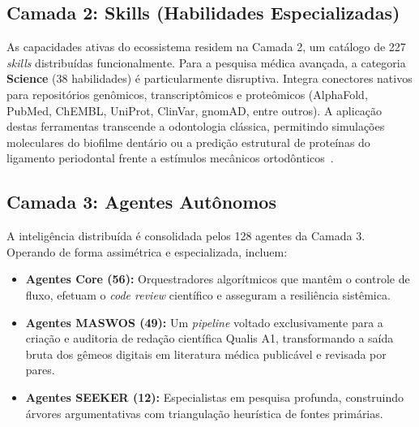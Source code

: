 \subsection{Camada 2: Skills (Habilidades Especializadas)}
As capacidades ativas do ecossistema residem na Camada 2, um catálogo de 227 \textit{skills} distribuídas funcionalmente. Para a pesquisa médica avançada, a categoria \textbf{Science} (38 habilidades) é particularmente disruptiva. Integra conectores nativos para repositórios genômicos, transcriptômicos e proteômicos (AlphaFold, PubMed, ChEMBL, UniProt, ClinVar, gnomAD, entre outros). A aplicação destas ferramentas transcende a odontologia clássica, permitindo simulações moleculares do biofilme dentário ou a predição estrutural de proteínas do ligamento periodontal frente a estímulos mecânicos ortodônticos~\cite{Li2025, Roy2025}.

\subsection{Camada 3: Agentes Autônomos}
A inteligência distribuída é consolidada pelos 128 agentes da Camada 3. Operando de forma assimétrica e especializada, incluem:
\begin{itemize}
    \item \textbf{Agentes Core (56):} Orquestradores algorítmicos que mantêm o controle de fluxo, efetuam o \textit{code review} científico e asseguram a resiliência sistêmica.
    \item \textbf{Agentes MASWOS (49):} Um \textit{pipeline} voltado exclusivamente para a criação e auditoria de redação científica Qualis A1, transformando a saída bruta dos gêmeos digitais em literatura médica publicável e revisada por pares.
    \item \textbf{Agentes SEEKER (12):} Especialistas em pesquisa profunda, construindo árvores argumentativas com triangulação heurística de fontes primárias.
\end{itemize}

